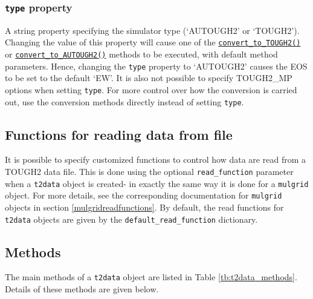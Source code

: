\begin{snugshade}
\subsubsection{\texttt{type} property}
\end{snugshade}
\label{sec:t2data:type}

A string property specifying the simulator type (`AUTOUGH2' or `TOUGH2').  Changing the value of this property will cause one of the \hyperref[sec:t2data:convert_to_TOUGH2]{\texttt{convert\_to\_TOUGH2()}} or \hyperref[sec:t2data:convert_to_AUTOUGH2]{\texttt{convert\_to\_AUTOUGH2()}} methods to be executed, with default method parameters.  Hence, changing the \texttt{type} property to `AUTOUGH2' causes the EOS to be set to the default `EW'.  It is also not possible to specify TOUGH2\_MP options when setting \texttt{type}.  For more control over how the conversion is carried out, use the conversion methods directly instead of setting \texttt{type}.

\subsection{Functions for reading data from file}

It is possible to specify customized functions to control how data are read from a TOUGH2 data file. This is done using the optional \texttt{read\_function} parameter when a \texttt{t2data} object is created- in exactly the same way it is done for a \texttt{mulgrid} object. For more details, see the corresponding documentation for \texttt{mulgrid} objects in section \ref{mulgridreadfunctions}. By default, the read functions for \texttt{t2data} objects are given by the \texttt{default\_read\_function} dictionary.

\subsection{Methods}

The main methods of a \texttt{t2data} object are listed in Table \ref{tb:t2data_methods}.  Details of these methods are given below.


